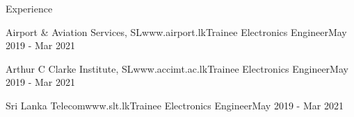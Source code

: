 \documentclass[
	11pt, %
]{./../assets/resume} %
\begin{document}
\begin{rSection}{Experience}
	\begin{rSubsectionSimpleX}{Airport \& Aviation Services, SL}{www.airport.lk}{Trainee Electronics Engineer}{May 2019 - Mar 2021}
	\end{rSubsectionSimpleX}

	\begin{rSubsectionSimpleX}{Arthur C Clarke Institute, SL}{www.accimt.ac.lk}{Trainee Electronics Engineer}{May 2019 - Mar 2021}
	\end{rSubsectionSimpleX}

	\begin{rSubsectionSimpleX}{Sri Lanka Telecom}{www.slt.lk}{Trainee Electronics Engineer}{May 2019 - Mar 2021}
	\end{rSubsectionSimpleX}


\end{rSection}

\end{document}
